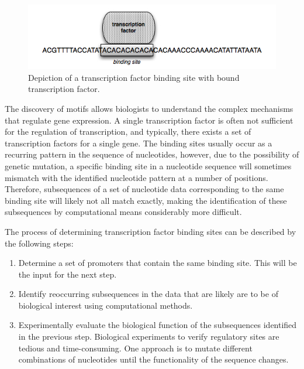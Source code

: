 \begin{figure}[h]
\begin{center}
 \includegraphics[width=\linewidth]{images/binding_site}
\caption{Depiction of a transcription factor binding site with bound transcription factor.}
\label{fig:binding_site}
\end{center}
\end{figure}

The discovery of motifs allows biologists to understand the complex mechanisms that regulate gene expression. A single transcription factor is often not sufficient for the regulation of transcription, and typically, there exists a set of transcription factors for a single gene.  The binding sites usually occur as a recurring pattern in the sequence of nucleotides, however, due to the possibility of genetic mutation, a specific binding site in a nucleotide sequence will sometimes mismatch with the identified nucleotide pattern at a number of positions.  Therefore, subsequences of a set of nucleotide data corresponding to the same binding site will likely not all match exactly, making the identification of these subsequences by computational means considerably more difficult.  

The process of determining transcription factor binding sites can be described by the following steps: 
\begin{enumerate}
\item Determine a set of promoters that contain the same binding site. This will be the input for the next step.  
\item Identify reoccurring subsequences in the data that are likely are to be of biological interest using computational methods.  
\item Experimentally evaluate the biological function of the subsequences identified in the previous step. Biological experiments to verify regulatory sites are tedious and time-consuming.  One approach is to mutate different combinations of nucleotides until the functionality of the sequence changes.  
\end{enumerate} 

